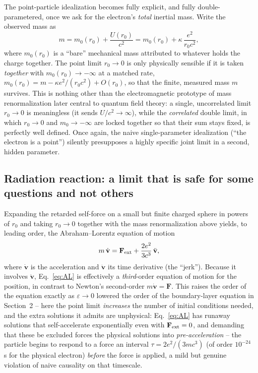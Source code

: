 \documentclass[11pt]{article}
\newcommand{\vv}[1]{\mathbf{#1}}
\begin{document}
The point-particle idealization becomes fully explicit, and fully double-parametered, once we ask for the electron's \emph{total} inertial mass. Write the observed mass as
\begin{equation}
m = m_0(r_0) + \frac{U(r_0)}{c^2} = m_0(r_0) + \kappa\,\frac{e^2}{r_0 c^2},
\end{equation}
where $m_0(r_0)$ is a ``bare'' mechanical mass attributed to whatever holds the charge together. The point limit $r_0\to0$ is only physically sensible if it is taken \emph{together} with $m_0(r_0)\to-\infty$ at a matched rate, $m_0(r_0) = m - \kappa e^2/(r_0c^2) + O(r_0)$, so that the finite, measured mass $m$ survives. This is nothing other than the electromagnetic prototype of mass renormalization later central to quantum field theory: a single, uncorrelated limit $r_0\to0$ is meaningless (it sends $U/c^2\to\infty$), while the \emph{correlated} double limit, in which $r_0\to0$ and $m_0\to-\infty$ are locked together so that their sum stays fixed, is perfectly well defined. Once again, the naive single-parameter idealization (``the electron is a point'') silently presupposes a highly specific joint limit in a second, hidden parameter.

\subsection{Radiation reaction: a limit that is safe for some questions and not others}

Expanding the retarded self-force on a small but finite charged sphere in powers of $r_0$ and taking $r_0\to0$ together with the mass renormalization above yields, to leading order, the Abraham--Lorentz equation of motion
\begin{equation}
m\,\dot{\vv v} = \vv F_{\rm ext} + \frac{2e^2}{3c^3}\,\ddot{\vv v},
\label{eq:AL}
\end{equation}
where $\dot{\vv v}$ is the acceleration and $\ddot{\vv v}$ its time derivative (the ``jerk''). Because it involves $\ddot{\vv v}$, Eq.~\eqref{eq:AL} is effectively a \emph{third}-order equation of motion for the position, in contrast to Newton's second-order $m\dot{\vv v}=\vv F$. This raises the order of the equation exactly as $\varepsilon\to0$ lowered the order of the boundary-layer equation in Section~2 -- here the point limit \emph{increases} the number of initial conditions needed, and the extra solutions it admits are unphysical: Eq.~\eqref{eq:AL} has runaway solutions that self-accelerate exponentially even with $\vv F_{\rm ext}=0$, and demanding that these be excluded forces the physical solutions into \emph{pre-acceleration} -- the particle begins to respond to a force an interval $\tau=2e^2/(3mc^3)$ (of order $10^{-24}\,$s for the physical electron) \emph{before} the force is applied, a mild but genuine violation of naive causality on that timescale.
\end{document}

